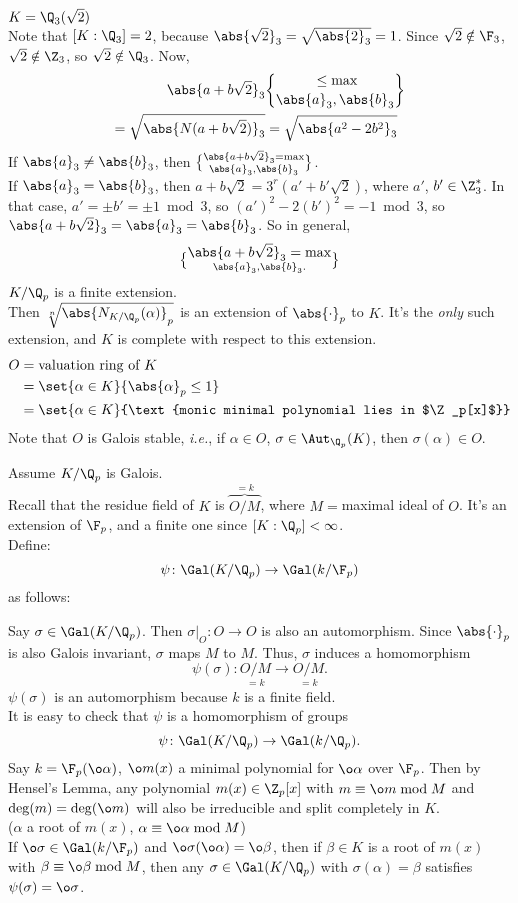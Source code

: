 \eg $K=\Q_3(\sqrt2)$ \\
Note that $[K:\Q_3]=2$, because $\abs{\sqrt2}_3=\sqrt{\abs{2}_3}=1$.  Since $\sqrt2\notin\F_3$, $\sqrt2\notin\Z_3$, so $\sqrt2\notin\Q_3$.
Now,
\begin{align*}
\abs{a+b\sqrt2}_3 &\leq \max\brace{\abs{a}_3,\abs{b}_3} \\
=\sqrt{\abs{N(a+b\sqrt2)}_3} &= \sqrt{\abs{a^2-2b^2}_3}
\end{align*}
If $\abs{a}_3\neq\abs{b}_3$, then $\abs{a+b\sqrt2}_3=\max\brace{\abs{a}_3,\abs{b}_3}$. \\
If $\abs{a}_3=\abs{b}_3$, then $a+b\sqrt2=3^r(a'+b'\sqrt2)$, where $a'$, $b'\in\Z_3^*$.  In that case, $a'=\pm b'=\pm1\bmod3$, so $(a')^2-2(b')^2=-1\bmod3$, so $\abs{a+b\sqrt2}_3=\abs{a}_3=\abs{b}_3$.  So in general,
\[ \abs{a+b\sqrt2}_3 = \max\brace{\abs{a}_3,\abs{b}_3} . \]
%
$K/\Q_p$ is a finite extension. \\
Then $\sqrt[n]{\abs{N_{K/\Q_p}(\alpha)}_p}$ is an extension of $\abs{\cdot}_p$ to $K$.  It's the \emph{only} such extension, and $K$ is complete with respect to this extension.
\begin{align*}
O &= \text{valuation ring of $K$} \\
&= \set{\alpha\in K}{\abs{\alpha}_p\leq1} \\
&= \set{\alpha\in K}{\text{monic minimal polynomial lies in $\Z_p[x]$}}
\end{align*}
Note that $O$ is Galois stable, \emph{i.e.}, if $\alpha\in O$, $\sigma\in\Aut_{\Q_p}(K)$, then $\sigma(\alpha)\in O$.

Assume $K/\Q_p$ is Galois. \\
Recall that the residue field of $K$ is $\overbrace{O/M}^{=k}$, where $M={}$maximal ideal of $O$.  It's an extension of $\F_p$, and a finite one since $[K:\Q_p]<\infty$. \\
Define:
\[ \psi\colon\Gal(K/\Q_p) \to \Gal(k/\F_p) \]
as follows:

Say $\sigma\in\Gal(K/\Q_p)$.  Then $\sigma|_O\colon O\to O$ is also an automorphism.  Since $\abs{\cdot}_p$ is also Galois invariant, $\sigma$ maps $M$ to $M$.  Thus, $\sigma$ induces a homomorphism
\[ \psi(\sigma)\colon \underset{=k}{O/M}\to\underset{=k}{O/M} . \]
$\psi(\sigma)$ is an automorphism because $k$ is a finite field. \\
It is easy to check that $\psi$ is a homomorphism of groups
\[ \psi\colon\Gal(K/\Q_p)\to\Gal(k/\Q_p). \]
Say $k=\F_p(\o\alpha)$, $\o m(x)$ a minimal polynomial for $\o\alpha$ over $\F_p$.  Then by Hensel's Lemma, any polynomial $m(x)\in\Z_p[x]$ with $m\equiv\o m\bmod M$ and $\deg(m)=\deg(\o m)$ will also be irreducible and split completely in $K$. \\
($\alpha$ a root of $m(x)$, $\alpha\equiv\o\alpha\bmod M$) \\
If $\o\sigma\in\Gal(k/\F_p)$ and $\o\sigma(\o\alpha)=\o\beta$, then if $\beta\in K$ is a root of $m(x)$ with $\beta\equiv\o\beta\bmod M$, then any $\sigma\in\Gal(K/\Q_p)$ with $\sigma(\alpha)=\beta$ satisfies $\psi(\sigma)=\o\sigma$.

